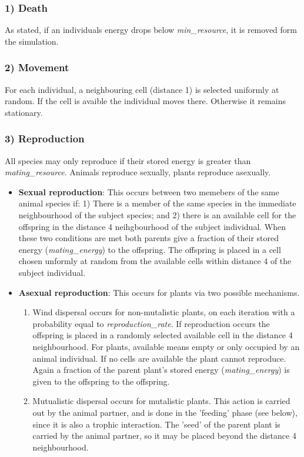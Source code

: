\subsubsection*{1) Death}
As stated, if an individuals energy drops below \emph{min\_resource}, it is removed form the simulation.
\subsubsection*{2) Movement}
For each individual, a neighbouring cell (distance 1) is selected uniformly at random. If the cell is avaible the individual moves there. Otherwise it remains stationary.
\subsubsection*{3) Reproduction}
All species may only reproduce if their stored energy is greater than \emph{mating\_resource}. Animals reproduce sexually, plants reproduce asexually.
\begin{itemize}
	\item \textbf{Sexual reproduction}: This occurs between two memebers of the same animal species if: 1) There is a member of the same species in the immediate neighbourhood of the subject species; and 2) there is an available cell for the offspring in the distance 4 neihgbourhood of the subject individual. When these two conditions are met both parents give a fraction of their stored energy (\emph{mating\_energy}) to the offspring. The offspring is placed in a cell chosen unformly at random from the available cells within distance 4 of the subject individual.
	\item \textbf{Asexual reproduction}: This occurs for plants via two possible mechanisms. 
	\begin{enumerate}
	\item Wind dispersal occurs for non-mutalistic plants, on each iteration with a probability equal to \emph{reproduction\_rate}. If reproduction occurs the offspring is placed in a randomly selected available cell in the distance 4 neighbourhood. For plants, available means empty or only occupied by an animal individual. If no cells are available the plant cannot reproduce. Again a fraction of the parent plant's stored energy (\emph{mating\_energy}) is given to the offspring to the offspring.
	\item Mutualistic dispersal occurs for mutalistic plants. This action is carried out by the animal partner, and is done in the 'feeding' phase (see below), since it is also a trophic interaction. The 'seed' of the parent plant is carried by the animal partner, so it may be placed beyond the distance 4 neighbourhood. 
    \end{enumerate}	 
\end{itemize}
